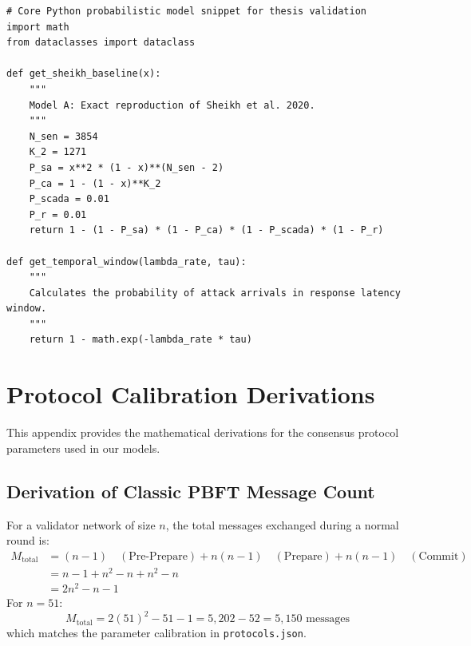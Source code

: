 \documentclass[12pt, oneside, a4paper]{report}
\theoremstyle{definition}
\theoremstyle{remark}
\begin{document}
\begin{lstlisting}[style=pythonstyle, caption={Python analytical model library implementing Model A and Model B paths.}, label={lst:prob_model}]
# Core Python probabilistic model snippet for thesis validation
import math
from dataclasses import dataclass

def get_sheikh_baseline(x):
    """
    Model A: Exact reproduction of Sheikh et al. 2020.
    """
    N_sen = 3854
    K_2 = 1271
    P_sa = x**2 * (1 - x)**(N_sen - 2)
    P_ca = 1 - (1 - x)**K_2
    P_scada = 0.01
    P_r = 0.01
    return 1 - (1 - P_sa) * (1 - P_ca) * (1 - P_scada) * (1 - P_r)

def get_temporal_window(lambda_rate, tau):
    """
    Calculates the probability of attack arrivals in response latency window.
    """
    return 1 - math.exp(-lambda_rate * tau)
\end{lstlisting}
\label{lst:app:code}


\cleardoublepage


\chapter{Protocol Calibration Derivations}
\label{app:calibration_derivations}

This appendix provides the mathematical derivations for the consensus protocol parameters used in our models.

\section{Derivation of Classic PBFT Message Count}
For a validator network of size $n$, the total messages exchanged during a normal round is:
\begin{align}
M_{\mathrm{total}} &= (n-1) \quad (\text{Pre-Prepare}) + n(n-1) \quad (\text{Prepare}) + n(n-1) \quad (\text{Commit}) \\
&= n-1 + n^2 - n + n^2 - n \\
&= 2n^2 - n - 1
\end{align}
For $n=51$:
\begin{equation}
M_{\mathrm{total}} = 2(51)^2 - 51 - 1 = 5{,}202 - 52 = 5{,}150 \text{ messages}
\end{equation}
which matches the parameter calibration in \texttt{protocols.json}.


\cleardoublepage



\end{document}
